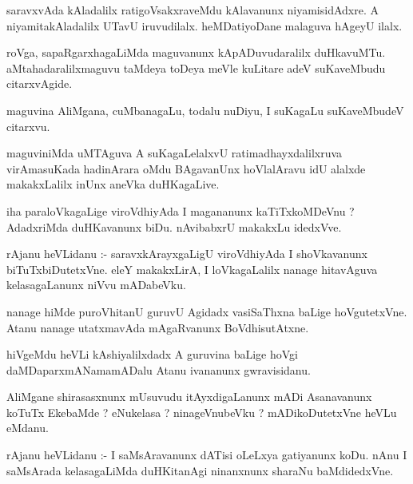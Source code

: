 \documentclass{article}
\begin{document}
\begin{mn}
saravxvAda  kAladalilx  ratigoVsakxraveMdu  kAlavanunx  niyamisidAdxre.  A  niyamitakAladalilx  UTavU  
iruvudilalx.  heMDatiyoDane  malaguva  hAgeyU  ilalx.
\end{mn}

\begin{mn}
roVga,  sapaRgarxhagaLiMda  maguvanunx  kApADuvudaralilx  duHkavuMTu.  aMtahadaralilxmaguvu  taMdeya  
toDeya  meVle  kuLitare  adeV  suKaveMbudu  citarxvAgide.
\end{mn}

\begin{mn}
maguvina  AliMgana,  cuMbanagaLu,  todalu nuDiyu,  I  suKagaLu  suKaveMbudeV  citarxvu.
\end{mn}

\begin{mn}
maguviniMda  uMTAguva  A  suKagaLelalxvU  ratimadhayxdalilxruva  virAmasuKada  hadinArara  oMdu  
BAgavanUnx  hoVlalAravu  idU  alalxde  makakxLalilx  inUnx  aneVka  duHKagaLive.
\end{mn}

\begin{mn}
iha paraloVkagaLige  viroVdhiyAda  I  magananunx  kaTiTxkoMDeVnu ?  AdadxriMda  duHKavanunx  biDu.  
nAvibabxrU  makakxLu  idedxVve. 
\end{mn}

\begin{mn}
rAjanu  heVLidanu :- saravxkArayxgaLigU  viroVdhiyAda  I  shoVkavanunx  biTuTxbiDutetxVne.  eleY  
makakxLirA,  I  loVkagaLalilx  nanage  hitavAguva  kelasagaLanunx  niVvu  mADabeVku.
\end{mn}

\begin{mn}
nanage  hiMde  puroVhitanU  guruvU  Agidadx  vasiSaThxna  baLige  hoVgutetxVne.  Atanu  nanage  
utatxmavAda  mAgaRvanunx  BoVdhisutAtxne.
\end{mn}

\begin{mn}
hiVgeMdu  heVLi  kAshiyalilxdadx  A  guruvina  baLige  hoVgi  daMDaparxmANamamADalu  Atanu  ivananunx  gwravisidanu.
\end{mn}

\begin{mn}
AliMgane  shirasasxnunx  mUsuvudu  itAyxdigaLanunx  mADi  Asanavanunx  koTuTx  EkebaMde ?  eNukelasa ?  
ninageVnubeVku ?  mADikoDutetxVne  heVLu  eMdanu.
\end{mn}

\begin{mn}
rAjanu  heVLidanu :- I  saMsAravanunx  dATisi  oLeLxya  gatiyanunx  koDu.  nAnu  I  saMsArada  
kelasagaLiMda  duHKitanAgi  ninanxnunx  sharaNu baMdidedxVne.
\end{mn}
\end{document}

